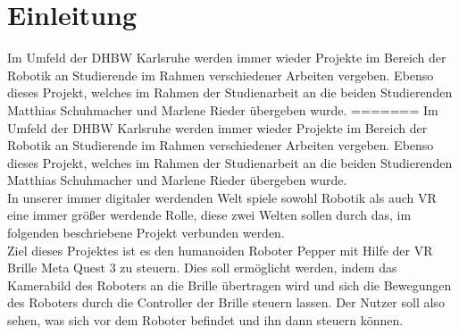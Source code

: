 \chapter{Einleitung}
Im Umfeld der \ac{DHBW} Karlsruhe werden immer wieder Projekte im Bereich der Robotik an Studierende im Rahmen verschiedener Arbeiten vergeben. Ebenso dieses Projekt, welches im Rahmen der Studienarbeit an die beiden Studierenden Matthias Schuhmacher und Marlene Rieder übergeben wurde. 
=======
Im Umfeld der \ac{DHBW} Karlsruhe werden immer wieder Projekte im Bereich der Robotik an Studierende im Rahmen verschiedener Arbeiten vergeben. Ebenso dieses Projekt, welches im Rahmen der Studienarbeit an die beiden Studierenden Matthias Schuhmacher und Marlene Rieder übergeben wurde.
\\

\noindent 
In unserer immer digitaler werdenden Welt spiele sowohl Robotik als auch \ac{VR} eine immer größer werdende Rolle, diese zwei Welten sollen durch das, im folgenden beschriebene Projekt verbunden werden.
\\

\noindent
Ziel dieses Projektes ist es den humanoiden Roboter Pepper mit Hilfe der \ac{VR} Brille Meta Quest 3 zu steuern. Dies soll ermöglicht werden, indem das Kamerabild des Roboters an die Brille übertragen wird und sich die Bewegungen des Roboters durch die Controller der Brille steuern lassen. Der Nutzer soll also sehen, was sich vor dem Roboter befindet und ihn dann steuern können.

